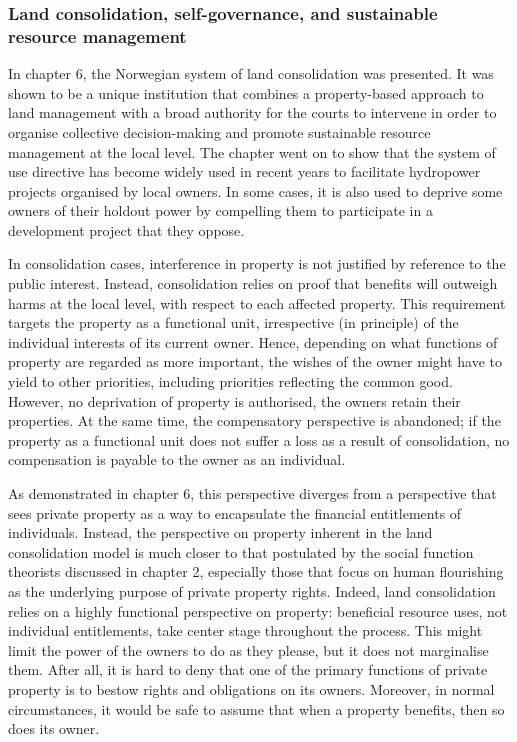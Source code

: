 \subsubsection*{Land consolidation, self-governance, and sustainable resource management}

In chapter 6, the Norwegian system of land consolidation was presented. It was shown to be a unique institution that combines a property-based approach to land management with a broad authority for the courts to intervene in order to organise collective decision-making and promote sustainable resource management at the local level. The chapter went on to show that the system of use directive has become widely used in recent years to facilitate hydropower projects organised by local owners. In some cases, it is also used to deprive some owners of their holdout power by compelling them to participate in a development project that they oppose.

In consolidation cases, interference in property is not justified by reference to the public interest. Instead, consolidation relies on proof that benefits will outweigh harms at the local level, with respect to each affected property. This requirement targets the property as a functional unit, irrespective (in principle) of the individual interests of its current owner. Hence, depending on what functions of property are regarded as more important, the wishes of the owner might have to yield to other priorities, including priorities reflecting the common good. However, no deprivation of property is authorised, the owners retain their properties. At the same time, the compensatory perspective is abandoned; if the property as a functional unit does not suffer a loss as a result of consolidation, no compensation is payable to the owner as an individual.

As demonstrated in chapter 6, this perspective diverges from a perspective that sees private property as a way to encapsulate the financial entitlements of individuals. Instead, the perspective on property inherent in the land consolidation model is much closer to that postulated by the social function theorists discussed in chapter 2, especially those that focus on human flourishing as the underlying purpose of private property rights. Indeed, land consolidation relies on a highly functional perspective on property: beneficial resource uses, not individual entitlements, take center stage throughout the process. This might limit the power of the owners to do as they please, but it does not marginalise them. After all, it is hard to deny that one of the primary functions of private property is to bestow rights and obligations on its owners. Moreover, in normal circumstances, it would be safe to assume that when a property benefits, then so does its owner.

